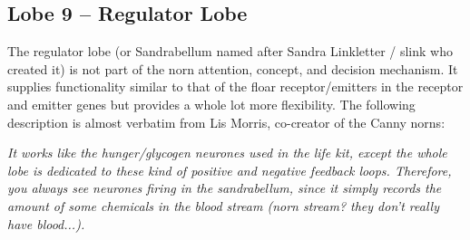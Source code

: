 \documentclass[11pt,twoside,a4paper]{article}
\begin{document}
\subsection{Lobe 9 -- Regulator Lobe}


The regulator lobe (or Sandrabellum named after Sandra Linkletter / slink who created it) is not part of the norn attention, concept, and decision mechanism. It supplies functionality similar to that of the floar receptor/emitters in the receptor and emitter genes but provides a whole lot more flexibility. The following description is almost verbatim from Lis Morris, co-creator of the Canny norns:

\emph{It works like the hunger/glycogen neurones used in the life kit, except the whole lobe is dedicated to these kind of positive and negative feedback loops. Therefore, you always see neurones firing in the sandrabellum, since it simply records the amount of some chemicals in the blood stream (norn stream? they don't really have blood...).} %
\end{document}

